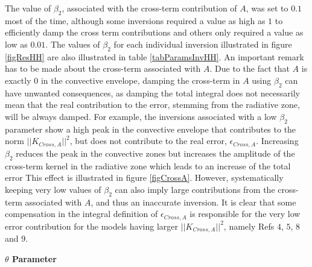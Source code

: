 \documentclass[a4paper,fleqn,usenatbib]{mnras}
\begin{document}
The value of $\beta_{2}$, associated with the cross-term contribution of $A$, was set to $0.1$ most of the time, although some inversions required a value as high as $1$ to efficiently damp the cross term contributions and others only required a value as low as $0.01$. The values of $\beta_{2}$ for each individual inversion illustrated in figure \ref{figResHH} are also illustrated in table \ref{tabParamsInvHH}. An important remark has to be made about the cross-term associated with $A$. Due to the fact that $A$ is exactly $0$ in the convective envelope, damping the cross-term in $A$ using $\beta_{2}$ can have unwanted consequences, as damping the total integral does not necessarily mean that the real contribution to the error, stemming from the radiative zone, will be always damped. For example, the inversions associated with a low $\beta_{2}$ parameter show a high peak in the convective envelope that contributes to the norm $\vert \vert K_{Cross,A} \vert \vert^{2}$, but does not contribute to the real error, $\epsilon_{Cross,A}$. Increasing $\beta_{2}$ reduces the peak in the convective zones but increases the amplitude of the cross-term kernel in the radiative zone which leads to an increase of the total error This effect is illustrated in figure \ref{figCrossA}. However, systematically keeping very low values of $\beta_{2}$ can also imply large contributions from the cross-term associated with $A$, and thus an inaccurate inversion. It is clear that some compensation in the integral definition of $\epsilon_{Cross,A}$ is responsible for the very low error contribution for the models having larger $\vert \vert K_{Cross,A} \vert \vert^{2}$, namely Refs $4$, $5$, $8$ and $9$. 

\begin{flushleft}
\textbf{$\theta$ Parameter}
\end{flushleft}
\end{document}
